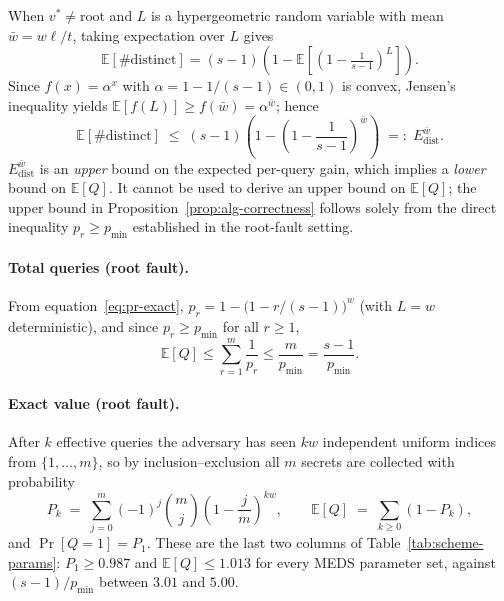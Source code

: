 \begin{remark}
When \(v^* \neq \mathrm{root}\) and \(L\) is a hypergeometric random variable
with mean \(\bar{w} = w\ell/t\), taking expectation over \(L\) gives
\[
  \mathbb{E}[\text{\#distinct}]
  = (s-1)\!\left(1 - \mathbb{E}\!\left[\left(1-\tfrac{1}{s-1}\right)^{\!L}\right]\right).
\]
Since \(f(x) = \alpha^x\) with \(\alpha = 1 - 1/(s-1) \in (0,1)\) is convex,
Jensen's inequality yields \(\mathbb{E}[f(L)] \geq f(\bar{w}) = \alpha^{\bar{w}}\);
hence
\begin{equation}
  \mathbb{E}[\text{\#distinct}]
  \;\leq\; (s-1)\!\left(1 - \left(1-\frac{1}{s-1}\right)^{\!\bar{w}}\right)
  \;=:\; E_{\mathrm{dist}}^{\bar{w}}.
  \label{eq:edist-jensen}
\end{equation}
\(E_{\mathrm{dist}}^{\bar{w}}\) is an \emph{upper} bound on the expected per-query
gain, which implies a \emph{lower} bound on \(\mathbb{E}[Q]\).  It cannot be
used to derive an upper bound on \(\mathbb{E}[Q]\); the upper bound in
Proposition~\ref{prop:alg-correctness} follows solely from the direct inequality
\(p_r \geq p_{\min}\) established in the root-fault setting.
\end{remark}

\paragraph{Total queries (root fault).}
From equation~\eqref{eq:pr-exact},
\(p_r = 1 - \bigl(1 - r/(s-1)\bigr)^{w}\) (with \(L = w\) deterministic),
and since \(p_r \geq p_{\min}\) for all \(r \geq 1\),
\[
  \mathbb{E}[Q] \leq \sum_{r=1}^{m} \frac{1}{p_r} \leq \frac{m}{p_{\min}}
  = \frac{s-1}{p_{\min}}.
\]

\paragraph{Exact value (root fault).}
After $k$ effective queries the adversary has seen $kw$ independent uniform
indices from $\{1,\ldots,m\}$, so by inclusion--exclusion all $m$ secrets are
collected with probability
\[
  P_k \;=\; \sum_{j=0}^{m} (-1)^j \binom{m}{j}
  \left(1 - \frac{j}{m}\right)^{\!kw},
  \qquad
  \mathbb{E}[Q] \;=\; \sum_{k \geq 0} (1 - P_k),
\]
and $\Pr[Q = 1] = P_1$. These are the last two columns of
Table~\ref{tab:scheme-params}: $P_1 \geq 0.987$ and
$\mathbb{E}[Q] \leq 1.013$ for every MEDS parameter set, against
$(s-1)/p_{\min}$ between $3.01$ and $5.00$.